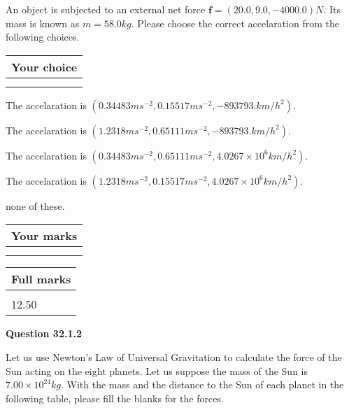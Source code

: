\documentclass[12pt]{article}
\begin{document}
  
 
An object is subjected to an external net force $\mathbf{f}=(
20.0 ,
9.0,
-4000.0  )N$. Its mass is known as
$m= %
58.0  kg$. Please choose the correct accelaration
from the following choices.
 
  
  
\noindent\hspace{3.0in} \begin{tabular}{|l|}
\hline
Your choice \\
\hline
 \\ 
 \\ 
\hline
\end{tabular}
  
  
 
 
The accelaration is
$(
0.34483ms^{-2},
0.15517ms^{-2},
-893793.km/h^2
).
$
 
 
The accelaration is
$(
1.2318ms^{-2},
0.65111ms^{-2},
-893793.km/h^2
).
$
 
 
The accelaration is
$(
0.34483ms^{-2},
0.65111ms^{-2},
4.0267 \times 10^{6}km/h^2
).
$
 
 
The accelaration is
$(
1.2318ms^{-2},
0.15517ms^{-2},
4.0267 \times 10^{6}km/h^2
).
$
 
 
none of these.
 
 
 
 

 
\vspace{0.3in}
  
\vspace{0.2in}
  
         \begin{tabular}{|l|}
\hline
 Your marks  \\
\hline
 \\ 
 \\ 
\hline
\end{tabular}
\hspace{0.05in} \begin{tabular}{|l|}
\hline
 Full marks  \\
\hline
 \\ 
12.50 \\
\hline
\end{tabular}
{\textbf{\Large{Question
32.1.2 
}}}
  
  
Let us use Newton's Law of Universal Gravitation to calculate the force
of the Sun acting on the eight planets. Let us suppose the mass of the
Sun is $ %
7.00 \times 10^{24} kg$. With the mass and the
distance to the Sun of each planet in the following table, please fill
the blanks for the forces.
 
\end{document}
